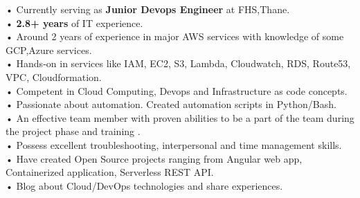 \documentclass[9pt]{developercv} %
\begin{document}
\vspace{0.5cm}



\begin{minipage}[t]{1\textwidth} %
	\vspace{-\baselineskip} %
	
 • Currently  serving as \textbf{Junior Devops Engineer} at FHS,Thane. \\ • \textbf{2.8+ years} of IT experience.  \\
    • Around 2 years of experience in major AWS services with knowledge of some GCP,Azure services. \\
    • Hands-on in services like IAM, EC2, S3, Lambda, Cloudwatch, RDS, Route53, VPC, Cloudformation.\\
    • Competent in Cloud Computing, Devops and Infrastructure as code concepts. \\
    • Passionate about automation. Created automation scripts in Python/Bash.\\
    • An effective team member with proven abilities to be a part of the team during the project phase and training .\\
    • Possess excellent troubleshooting, interpersonal and time management skills.\\
    • Have created Open Source projects ranging from Angular web app, Containerized application, Serverless REST API.\\
    • Blog about Cloud/DevOps technologies and share experiences. \\
    

\end{minipage}


\end{document}
